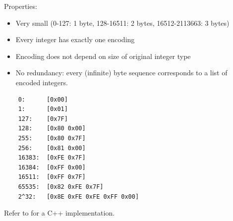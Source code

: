 \documentclass[12pt,oneside]{wlscirep}
\begin{document}
Properties:\par
\begin{itemize}
    \item Very small (0-127: 1 byte, 128-16511: 2 bytes, 16512-2113663: 3 bytes)
    \item Every integer has exactly one encoding
    \item Encoding does not depend on size of original integer type
    \item No redundancy: every (infinite) byte sequence corresponds to a list of encoded integers.
\end{itemize}
\begin{verbatim}
    0:      [0x00]  
    1:      [0x01]  
    127:    [0x7F]  
    128:    [0x80 0x00]  
    255:    [0x80 0x7F]  
    256:    [0x81 0x00]
    16383:  [0xFE 0x7F]
    16384:  [0xFF 0x00]
    16511:  [0xFF 0x7F]
    65535:  [0x82 0xFE 0x7F]
    2^32:   [0x8E 0xFE 0xFE 0xFF 0x00]
\end{verbatim}

Refer to \citep{bitcoins38:online} for a C++ implementation.
\end{document}
